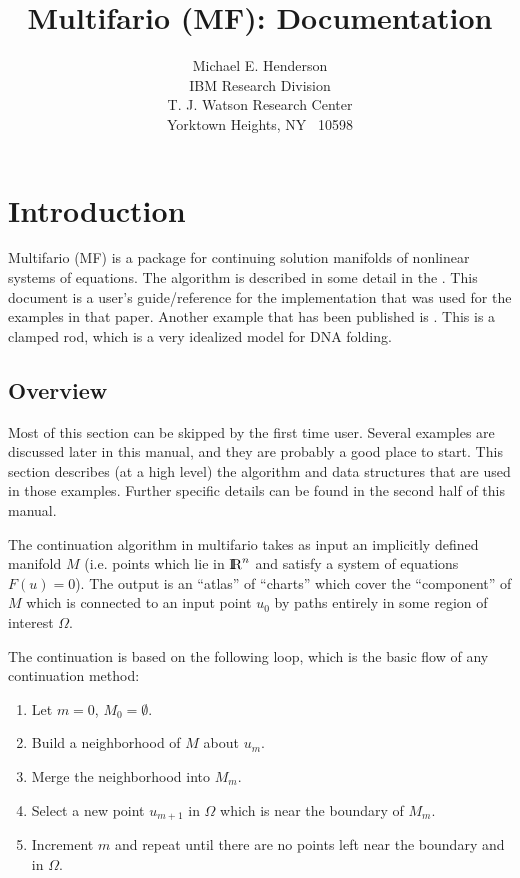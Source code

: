 \documentclass[12pt]{article}
\title{Multifario (MF): Documentation}
\author{
  Michael E. Henderson\\[.5\baselineskip]
  IBM Research Division\\
  T. J. Watson Research Center\\
  Yorktown Heights, NY ~10598\\
 }
\def\R{\hbox{\rm I\kern-.2150em R}}
\begin{document}
   \maketitle

\section{Introduction}

Multifario (MF) is a package for continuing solution manifolds of nonlinear systems of equations. 
The algorithm is described in some detail in the \cite{Henderson2002}.
This document is a user's guide/reference for the implementation that was used for the examples in that 
paper. Another example that has been published is \cite{HendersonNeukirch}. This is a clamped rod, which is 
a very idealized model for DNA folding.

\subsection{Overview}

Most of this section can be skipped by the first time user. Several examples are discussed later in this manual,
and they are probably a good place to start. This section describes (at a high level) the algorithm and data structures
that are used in those examples. Further specific details can be found in the second half of this manual.

The continuation algorithm in multifario takes as input an implicitly defined manifold $M$
(i.e. points which lie in $\R^n$ and satisfy a system of equations $F(u)=0$). The output is
an ``atlas'' of ``charts'' which cover the ``component'' of $M$ which is connected to an input
point $u_0$ by paths entirely in some region of interest $\Omega$.

The continuation is based on the following loop, which is the basic flow of any continuation method:
\begin{enumerate}
\item Let $m=0$, $M_0=\emptyset$.
\item Build a neighborhood of $M$ about $u_m$.
\item Merge the neighborhood into $M_m$.
\item Select a new point $u_{m+1}$ in $\Omega$ which is near the boundary of $M_m$.
\item Increment $m$ and repeat until there are no points left near the boundary and in $\Omega$.
\end{enumerate}
\end{document}
